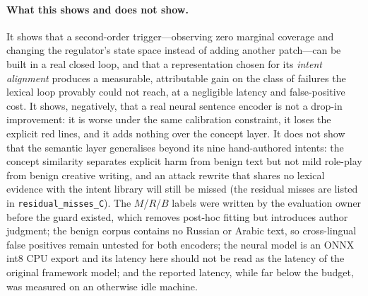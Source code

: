 \paragraph{What this shows and does not show.} It shows that a second-order
trigger---observing zero marginal coverage and changing the regulator's state
space instead of adding another patch---can be built in a real closed loop, and
that a representation chosen for its \emph{intent alignment} produces a
measurable, attributable gain on the class of failures the lexical loop provably
could not reach, at a negligible latency and false-positive cost. It shows,
negatively, that a real neural sentence encoder is not a drop-in improvement: it
is worse under the same calibration constraint, it loses the explicit red lines,
and it adds nothing over the concept layer. It does not show that the semantic
layer generalises beyond its nine hand-authored intents: the concept similarity
separates explicit harm from benign text but not mild role-play from benign
creative writing, and an attack rewrite that shares no lexical evidence with the
intent library will still be missed (the residual misses are listed in
\texttt{residual\_misses\_C}). The $M$/$R$/$B$ labels were written by the
evaluation owner before the guard existed, which removes post-hoc fitting but
introduces author judgment; the benign corpus contains no Russian or Arabic
text, so cross-lingual false positives remain untested for both encoders; the
neural model is an ONNX int8 CPU export and its latency here should not be read
as the latency of the original framework model; and the reported latency, while
far below the budget, was measured on an otherwise idle machine.

